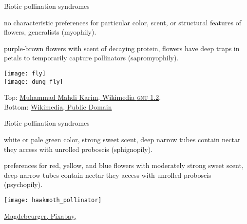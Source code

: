 \documentclass[t,handout]{beamer}  %
\begin{document}
%
\begin{frame}[t]{Biotic pollination syndromes}

	\begin{multicols}{2}
	
	\hangpara {} no characteristic preferences for particular color, scent, or structural features of flowers, generalists (myophily).
	
	\hangpara {} purple-brown flowers with scent of decaying protein, flowers have deep traps in petals to temporarily capture pollinators (sapromyophily).

	\columnbreak
	
		\texttt{[image: fly]}\\
		\texttt{[image: dung\_fly]}
		
	\end{multicols}
	
	\vfilll
	
	\hfill \tiny Top: \href{https://en.wikipedia.org/wiki/File:Chrysomya_megacephala_male.jpg}{Muhammad Mahdi Karim, Wikimedia \textsc{gnu} 1.2}.\\ \hfill Bottom: \href{https://commons.wikimedia.org/wiki/File:Dung_Fly_-_Scatophaga_stercoraria.jpg}{Wikimedia, Public Domain}
\end{frame}
%
\begin{frame}[t]{Biotic pollination syndromes}

	\begin{multicols}{2}
	\hangpara {} white or pale green color, strong sweet scent, deep narrow tubes contain nectar they access with unrolled proboscis (sphignopily).
	
	\hangpara {} preferences for red, yellow, and blue flowers with moderately strong sweet scent, deep narrow tubes contain nectar they access with unrolled proboscis (psychopily).
	
	
	\columnbreak
	
		\texttt{[image: hawkmoth\_pollinator]}
		
	\end{multicols}
	
	\vfilll
	
	\hfill \tiny \href{https://pixabay.com/en/hummingbird-hawk-moth-butterfly-542500/}{Magdebeurger, Pixabay, \cc{}}
\end{frame}
%
\end{document}
